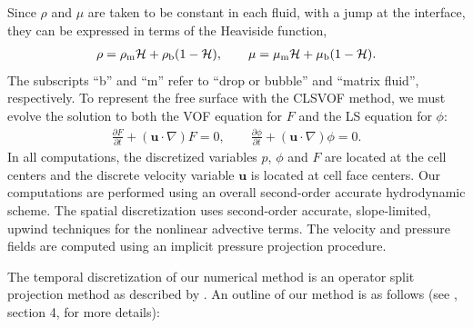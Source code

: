 \documentclass{elsarticle}
\newcommand{\Hea}{\mathcal{H}}
\newcommand{\vv}{\mathbf}
\newcommand{\bmu}{\vv{u}}
\begin{document}
Since $\rho$ and $\mu$ are taken to be constant in each fluid, with a jump at
the interface, they can be expressed in terms of the Heaviside function,
%
\begin{eqnarray}\label{rhomu}
  \rho=\rho_{\rm m}\Hea+\rho_{\rm b}(1-\Hea), \qquad 
  \mu=\mu_{\rm m}\Hea+\mu_{\rm b}(1-\Hea).
\end{eqnarray}
%
The subscripts ``b'' and ``m'' refer to ``drop or bubble'' and ``matrix fluid'', respectively. To represent the free surface with the CLSVOF method, we must evolve the solution to both the VOF equation for $F$ and the LS equation for $\phi$:
%
\begin{align}\label{eq:clsvof}
  \frac{\partial F}{\partial t}+(\bmu\cdot\nabla)F = 0, \qquad 
  \frac{\partial \phi}{\partial t}+(\bmu\cdot\nabla)\phi = 0. 
\end{align}
%
In all computations, the discretized variables $p$, $\phi$ and $F$ are located at the cell centers and the discrete velocity variable $\bmu$ is located at cell face centers.  Our computations are performed using an overall second-order accurate hydrodynamic scheme.  The spatial discretization uses second-order accurate, slope-limited, upwind techniques for the nonlinear advective terms.  The velocity and pressure fields are computed using an implicit pressure projection procedure.
\par
The temporal discretization of our numerical method is an operator split
projection method as described by \citet{SusSmiHusOhtZhi07}.  An outline of 
our method is as follows (see \citet{SusSmiHusOhtZhi07}, section 4, for more 
details):
\end{document}
